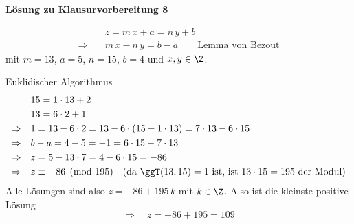 \textbf{Lösung zu Klausurvorbereitung 8}

\begin{loesung}
\begin{align*}
& z = m\,x + a = n\,y + b\\
\Rightarrow\quad & m\,x - n\,y = b - a \qquad \text{Lemma von Bezout}
\end{align*}
mit $m = 13$, $a = 5$, $n = 15$, $b = 4$ und $x, y \in \Z$.

Euklidischer Algorithmus
\begin{align*}
& 15 = 1 \cdot 13 + 2\\
& 13 = 6 \cdot 2 + 1\\
\Rightarrow\quad & 1 = 13 - 6 \cdot 2 = 13 - 6 \cdot (15 - 1 \cdot 13) = 7 \cdot 13 - 6 \cdot 15\\
\Rightarrow\quad & b - a = 4 - 5 = -1 = 6 \cdot 15 - 7 \cdot 13\\
\Rightarrow\quad & z = 5 - 13 \cdot 7 = 4 - 6 \cdot 15 = -86\\
\Rightarrow\quad & z \equiv -86 \pmod{195} \quad \text{(da } \ggT(13, 15) = 1 \text{ ist, ist } 13 \cdot 15 = 195 \text{ der Modul)}
\end{align*}
Alle Lösungen sind also $z = -86 + 195\,k$ mit $k \in \Z$. Also ist die kleinste positive Lösung
\[ \Rightarrow\quad z = -86 + 195 = 109 \]
\end{loesung}

